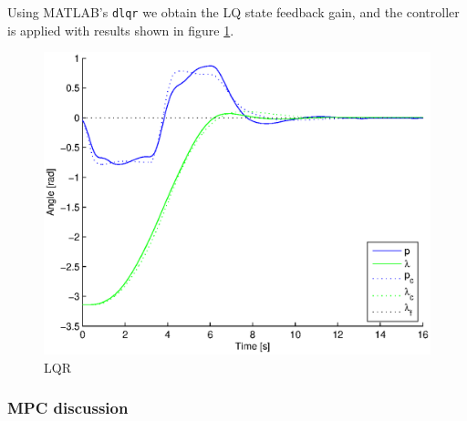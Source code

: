 Using MATLAB's \texttt{dlqr} we obtain the LQ state feedback gain, and the controller is applied with results shown in figure \ref{fig:lqr}.

\begin{figure}[hp]
	\centering
		\includegraphics[width=1.00\textwidth]{figures/3/lqr.eps}
	\caption{LQR}
	\label{fig:lqr}
\end{figure}

\subsubsection{MPC discussion}

